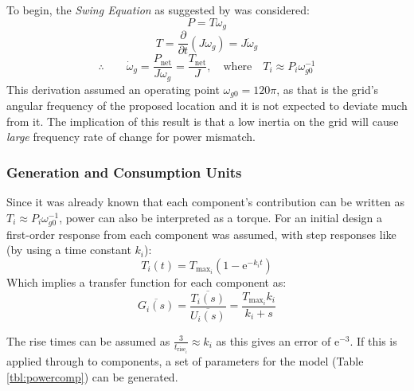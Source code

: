 To begin, the \emph{Swing Equation} as suggested by \cite{power:swing} was considered:
%
\begin{equation}
    P = T\omega_g
\end{equation}
%
\begin{equation}
        T = \frac{\partial}{\partial t} ( J \omega_g) = J \dot \omega_g
        \label{swing}
\end{equation}
%
\begin{equation}
        \therefore \qquad \dot \omega_g = \frac{P_{\text{net}}}{J \omega_g} = \frac{T_{\text{net}}}{J}, \quad \text{where} \quad  T_i \approx P_i \omega^{-1}_{g0}
\end{equation}
%
This derivation assumed an operating point $\omega_{g0} = 120\pi$, as that is the grid's angular frequency of the proposed location and it is not expected to deviate much from it.
The implication of this result is that a low inertia on the grid will cause \emph{large} frequency rate of change for power mismatch.

\subsubsection{Generation and Consumption Units}

Since it was already known that each component's contribution can be written as $ T_i \approx P_i \omega^{-1}_{g0}$, power can also be interpreted as a torque.
For an initial design a first-order response from each component was assumed, with step responses like (by using a time constant $k_i$):
\begin{equation}
        T_i(t) = T_{\text{max}_i}(1 - \mathrm{e}^{-k_i t})
\end{equation}
Which implies a transfer function for each component as:
\begin{equation}
        \overline{G_{i}(s)} = \frac{\overline{T_{i}(s)}}{\overline{U_{i}(s)}} = \frac{T_{\text{max}_{i}}k_i}{k_i + {s}}
\end{equation}

The rise times can be assumed as $\frac{3}{t_{\text{rise}_i}} \approx k_i$ as this gives an error of $\mathrm{e}^{-3}$. If this is applied through to components, a set of parameters for the model (Table \ref{tbl:powercomp}) can be generated.


